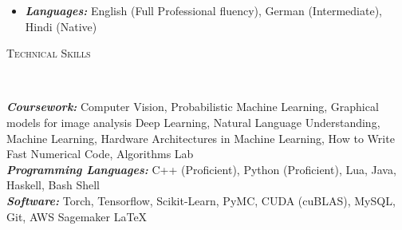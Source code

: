 \documentclass[9pt]{article}
\newenvironment{changemargin}[2]{%
  \begin{list}{}{%
      \setlength{\topsep}{0pt}%
    \setlength{\leftmargin}{#1}%
    \setlength{\rightmargin}{#2}%
    \setlength{\listparindent}{\parindent}%
  \setlength{\itemindent}{\parindent}%
    \setlength{\parsep}{\parskip}%
    }%
  \item[]}{\end{list}
    }
\newcommand{\lineover}{
  \begin{changemargin}{-0.05in}{-0.10in}
    \vspace*{-9pt}
    \hrulefill \\
    \vspace*{-2pt}
  \end{changemargin}
}
\newcommand{\header}[1]{
  \begin{changemargin}{-0.5in}{-0.5in}
    \scshape{#1}\\
        \lineover
  \end{changemargin}
}
\newenvironment{body} {
  \vspace*{-16pt}
        \begin{changemargin}{-0.6in}{-0.65in}
        }	
        {\end{changemargin}
}
\begin{document}
\begin{body}
\begin{changemargin}{0.15in}{0.15in}
\begin{itemize}
            \item \emph{\textbf{Languages:}} English (Full Professional fluency), 
              German (Intermediate), Hindi (Native)
          \end{itemize}
        \end{changemargin}
\end{body}
\vspace{3 mm}
\header{Technical Skills}

\vspace{3 mm}
\begin{body}
  \vspace{14pt}
        \begin{changemargin}{0.15in}{0.15in}
          \emph{\textbf{Coursework:}} Computer Vision, Probabilistic Machine Learning,
          Graphical models for image analysis 
          Deep Learning, Natural Language Understanding, Machine 
          Learning, Hardware Architectures in Machine Learning, 
          How to Write Fast Numerical Code, Algorithms Lab \\
          \emph{\textbf{Programming Languages: }}{} C++ (Proficient), Python (Proficient), 
          Lua, Java, Haskell, Bash Shell\\
          \emph{\textbf{Software: }}{} Torch, Tensorflow, Scikit-Learn, PyMC, CUDA (cuBLAS),
          MySQL, Git, AWS Sagemaker \LaTeX \\
        \end{changemargin}
\end{body}
\end{document}
